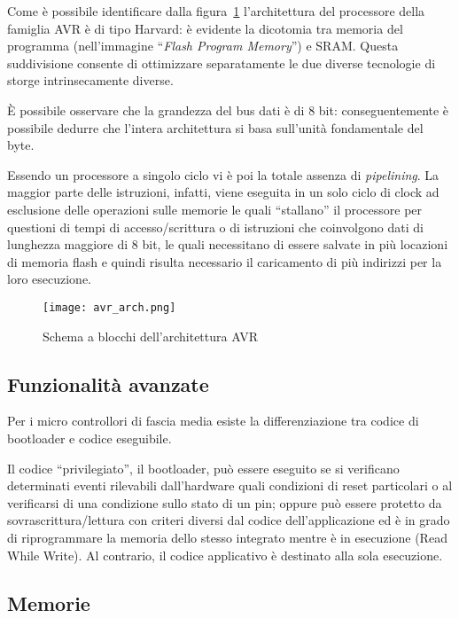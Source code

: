 Come è possibile identificare dalla figura~\ref{fig:avr-arch} l'architettura del processore della famiglia AVR è di tipo Harvard: è evidente la dicotomia tra memoria del programma (nell'immagine ``\textit{Flash Program Memory}'') e SRAM\cite{harvard-arch}. Questa suddivisione consente di ottimizzare separatamente le due diverse tecnologie di storge intrinsecamente diverse.

È possibile osservare che la grandezza del bus dati è di 8 bit: conseguentemente è possibile dedurre che l'intera architettura si basa sull'unità fondamentale del byte.

Essendo un processore a singolo ciclo vi è poi la totale assenza di \textit{pipelining}. La maggior parte delle istruzioni, infatti, viene eseguita in un solo ciclo di clock\cite[sec 7.6]{avr:m328p} ad esclusione delle operazioni sulle memorie le quali ``stallano'' il processore per questioni di tempi di accesso/scrittura o di istruzioni che coinvolgono dati di lunghezza maggiore di 8 bit, le quali necessitano di essere salvate in più locazioni di memoria flash e quindi risulta necessario il caricamento di più indirizzi per la loro esecuzione.

\begin{figure}[t]
    \centering
    \texttt{[image: avr\_arch.png]}
    \caption[Immagine ottenuta dal documento~\cite{avr:m328p} fig 7-1]{Schema a blocchi dell'architettura AVR\cite[fig 7-1]{avr:m328p}}\label{fig:avr-arch}
\end{figure}

\subsection{Funzionalità avanzate}\label{ss:advanced-features}

Per i micro controllori di fascia media esiste la differenziazione tra codice di bootloader e codice eseguibile.

Il codice ``privilegiato'', il bootloader, può essere eseguito se si verificano determinati eventi rilevabili dall'hardware quali condizioni di reset particolari o al verificarsi di una condizione sullo stato di un pin; oppure può essere protetto da sovrascrittura/lettura con criteri diversi dal codice dell'applicazione ed è in grado di riprogrammare la memoria dello stesso integrato mentre è in esecuzione (Read While Write)\cite[sec 27.4]{avr:m328p}. Al contrario, il codice applicativo è destinato alla sola esecuzione.

\subsection{Memorie}

